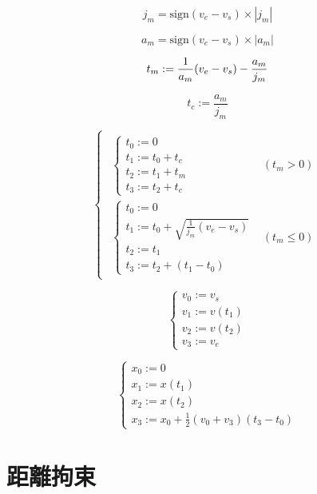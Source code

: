\documentclass[a5paper]{ltjsarticle}
\begin{document}
$$
    j_m = \mathrm{sign}(v_e-v_s) \times|j_m|
$$

$$
    a_m = \mathrm{sign}(v_e-v_s) \times|a_m|
$$

$$
    t_m := \frac{1}{a_m}(v_e - v_s) - \frac{a_m}{j_m} \\
$$

$$
    t_c := \frac{a_m}{j_m}
$$

$$
    \left\{ \begin{array}{l}
        \begin{array}{ll}
            \left\{ \begin{array}{l}
                t_0 := 0         \\
                t_1 := t_0 + t_c \\
                t_2 := t_1 + t_m \\
                t_3 := t_2 + t_c
            \end{array} \right.
             &
            (t_m > 0)
            \\
            \left\{ \begin{array}{l}
                t_0 := 0                                   \\
                t_1 := t_0 + \sqrt{\frac{1}{j_m}(v_e-v_s)} \\
                t_2 := t_1                                 \\
                t_3 := t_2 + (t_1-t_0)
            \end{array} \right.
             &
            (t_m \le 0)
        \end{array}
    \end{array} \right.
$$

$$
    \left\{ \begin{array}{l}
        v_0 := v_s    \\
        v_1 := v(t_1) \\
        v_2 := v(t_2) \\
        v_3 := v_e
    \end{array} \right.
$$

$$
    \left\{ \begin{array}{l}
        x_0 := 0      \\
        x_1 := x(t_1) \\
        x_2 := x(t_2) \\
        x_3 := x_0 + \frac{1}{2}(v_0 + v_3)(t_3-t_0)
    \end{array} \right.
$$

\section{距離拘束}
\end{document}
